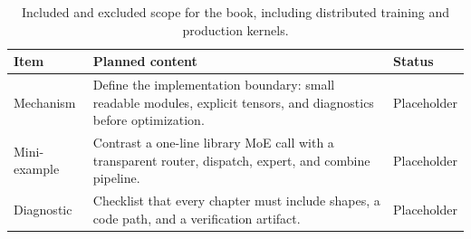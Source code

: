 \begin{table}[H]
\centering
\caption{Included and excluded scope for the book, including distributed training and production kernels.}
\label{tab:ch01-what-from-scratch-means-for-this-book}
\begin{tabularx}{\textwidth}{p{}X p{}}
\toprule
Item & Planned content & Status \\
\midrule
Mechanism & Define the implementation boundary: small readable modules, explicit tensors, and diagnostics before optimization. & Placeholder \\
Mini-example & Contrast a one-line library MoE call with a transparent router, dispatch, expert, and combine pipeline. & Placeholder \\
Diagnostic & Checklist that every chapter must include shapes, a code path, and a verification artifact. & Placeholder \\
\bottomrule
\end{tabularx}
\end{table}
